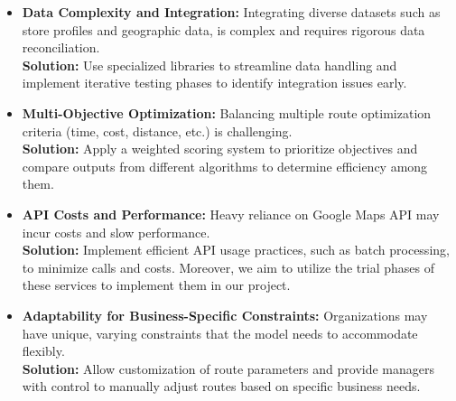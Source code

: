 \begin{itemize}

    \item \textbf{Data Complexity and Integration:} Integrating diverse datasets such as store profiles and geographic data, is complex and requires rigorous data reconciliation. \\
    \textbf{Solution:} Use specialized libraries to streamline data handling and implement iterative testing phases to identify integration issues early.

    \item \textbf{Multi-Objective Optimization:} Balancing multiple route optimization criteria (time, cost, distance, etc.) is challenging. \\
    \textbf{Solution:} Apply a weighted scoring system to prioritize objectives and compare outputs from different algorithms to determine efficiency among them.

    \item \textbf{API Costs and Performance:} Heavy reliance on Google Maps API may incur costs and slow performance. \\
    \textbf{Solution:} Implement efficient API usage practices, such as batch processing, to minimize calls and costs. Moreover, we aim to utilize the trial phases of these services to implement them in our project. 

    \item \textbf{Adaptability for Business-Specific Constraints:} Organizations may have unique, varying constraints that the model needs to accommodate flexibly. \\
    \textbf{Solution:} Allow customization of route parameters and provide managers with control to manually adjust routes based on specific business needs.
    
\end{itemize}